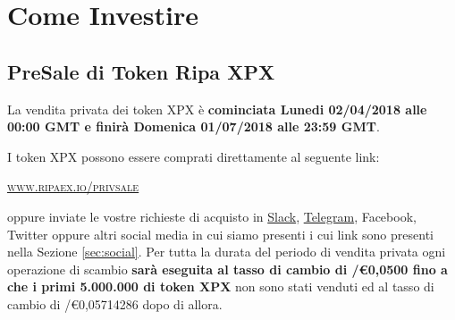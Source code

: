 \section{Come Investire}
\subsection{PreSale di Token Ripa XPX}
La vendita privata dei token XPX è \textbf{cominciata Lunedi 02/04/2018 alle 00:00 GMT e finirà Domenica
01/07/2018 alle 23:59 GMT}.

I token XPX possono essere comprati direttamente al seguente link:
\begin{center}
	\href{https://www.ripaex.io/privsale}{\textsc{www.ripaex.io/privsale}}
\end{center}

oppure inviate le vostre richieste di acquisto in
\href{https://join.slack.com/t/ripaex/shared_invite/enQtMzM4NzUwNjU4OTQ0LTY3MDJmMTdhYTNlZjJlNGUxNzM1YjUwYjgyYjZlMDJmOTg3NTIzNThmNTYyMGQ3ODBkOTRmYzk3Y2Y4MzBkOTY}{Slack}, 
\href{https://t.me/ripaex}{Telegram}, Facebook, Twitter oppure altri social media in cui siamo presenti
i cui link sono presenti nella Sezione \ref{sec:social}.
Per tutta la durata del periodo di vendita privata ogni operazione di scambio \textbf{sarà eseguita al tasso di cambio di
\PHP/\euro0,0500 fino a che i primi 5.000.000 di token XPX} non sono stati venduti ed al tasso di cambio di \PHP/\euro0,05714286 dopo di allora.

